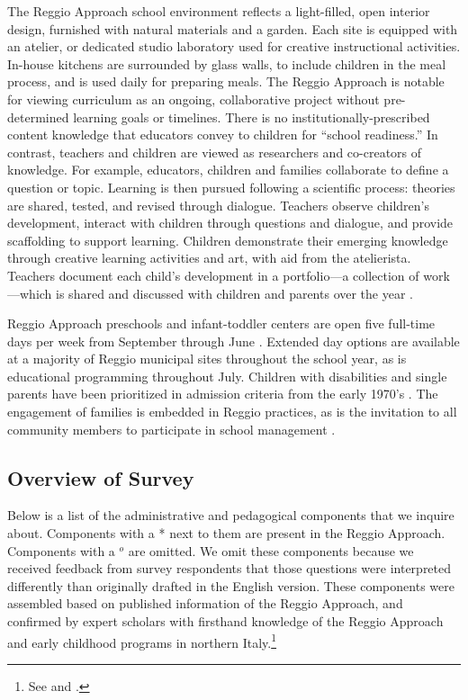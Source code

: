 The Reggio Approach school environment reflects a light-filled, open interior design, furnished with natural materials and a garden. Each site is equipped with an atelier, or dedicated studio laboratory used for creative instructional activities. In-house kitchens are surrounded by glass walls, to include children in the meal process, and is used daily for preparing meals. The Reggio Approach is notable for viewing curriculum as an ongoing, collaborative project without pre-determined learning goals or timelines. There is no institutionally-prescribed content knowledge that educators convey to children for ``school readiness.'' In contrast, teachers and children are viewed as researchers and co-creators of knowledge. For example, educators, children and families collaborate to define a question or topic. Learning is then pursued following a scientific process: theories are shared, tested, and revised through dialogue. Teachers observe children's development, interact with children through questions and dialogue, and provide scaffolding to support learning. Children demonstrate their emerging knowledge through creative learning activities and art, with aid from the atelierista. Teachers document each child's development in a portfolio---a collection of work---which is shared and discussed with children and parents over the year \citep{Rinaldi_2006_ReggioEmilia_BOOK,Giudici-Nicolosi_2014_Reggio-Approach}. 

Reggio Approach preschools and infant-toddler centers are open five full-time days per week from September through June \citep{Giudici-Nicolosi_2014_Reggio-Approach}. Extended day options are available at a majority of Reggio municipal sites throughout the school year, as is educational programming throughout July. Children with disabilities and single parents have been prioritized in admission criteria from the early 1970's \citep{Edwards-etal-eds_1998_Hundred-Languages}. The engagement of families is embedded in Reggio practices, as is the invitation to all community members to participate in school management \citep{CEHD_2016_Historical-Analysis,Cagliari-etal-eds_2016_BOOK_Loris-Malaguzzi}. 

\subsection{Overview of Survey}
Below is a list of the administrative and pedagogical components that we inquire about. Components with a * next to them are present in the Reggio Approach. Components with a $^o$ are omitted. We omit these components because we received feedback from survey respondents that those questions were interpreted differently than originally drafted in the English version. These components were assembled based on published information of the Reggio Approach, and confirmed by expert scholars with firsthand knowledge of the Reggio Approach and early childhood programs in northern Italy.\footnote{See \citet{Edwards-etal-eds_1998_Hundred-Languages} and \citet{Corsaro_2008_Policy-Practice}.}

